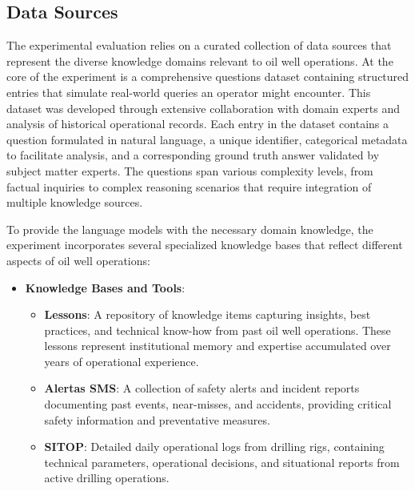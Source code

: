         \subsection{Data Sources}

                The experimental evaluation relies on a  curated collection of data sources that represent the diverse knowledge domains relevant to oil well operations. 
                At the core of the experiment is a comprehensive questions dataset containing structured entries that simulate real-world queries an operator might encounter. 
                This dataset was developed through extensive collaboration with domain experts and analysis of historical operational records.
                Each entry in the dataset contains a question formulated in natural language, a unique identifier, categorical metadata to facilitate analysis, and a corresponding ground truth answer validated by subject matter experts. The questions span various complexity levels, from factual inquiries to complex reasoning scenarios that require integration of multiple knowledge sources.

            To provide the language models with the necessary domain knowledge, the experiment incorporates several specialized knowledge bases that reflect different aspects of oil well operations:

            \begin{itemize}
                \item \textbf{Knowledge Bases and Tools}:
                \begin{itemize}
                    \item \textbf{Lessons}: A repository of knowledge items capturing insights, best practices, and technical know-how from past oil well operations. These lessons represent institutional memory and expertise accumulated over years of operational experience.
                    \item \textbf{Alertas SMS}: A collection of safety alerts and incident reports documenting past events, near-misses, and accidents, providing critical safety information and preventative measures.
                    \item \textbf{SITOP}: Detailed daily operational logs from drilling rigs, containing technical parameters, operational decisions, and situational reports from active drilling operations.
                \end{itemize}
            \end{itemize}

